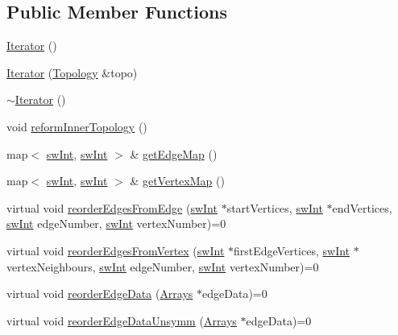 \subsection*{Public Member Functions}
\begin{DoxyCompactItemize}
\item 
\hyperlink{classIterator_a30f4489aebb0ea1a56da6925d03eecfb}{Iterator} ()
\item 
\hyperlink{classIterator_a74d2719764b4adbc85d62efd8b7aefaf}{Iterator} (\hyperlink{classTopology}{Topology} \&topo)
\item 
\hyperlink{classIterator_aab6716f5bdecb49e9cdd754359408ab6}{$\sim$Iterator} ()
\item 
void \hyperlink{classIterator_ad08f622629417fb8913d18d95150d8de}{reformInnerTopology} ()
\item 
map$<$ \hyperlink{swMacro_8h_a113cf5f6b5377cdf3fac6aa4e443e9aa}{swInt}, \hyperlink{swMacro_8h_a113cf5f6b5377cdf3fac6aa4e443e9aa}{swInt} $>$ \& \hyperlink{classIterator_ac3a2a5c322b527888c8689dd688f9aed}{getEdgeMap} ()
\item 
map$<$ \hyperlink{swMacro_8h_a113cf5f6b5377cdf3fac6aa4e443e9aa}{swInt}, \hyperlink{swMacro_8h_a113cf5f6b5377cdf3fac6aa4e443e9aa}{swInt} $>$ \& \hyperlink{classIterator_aa40b90d401685840ead9626e4ce067f0}{getVertexMap} ()
\item 
virtual void \hyperlink{classIterator_ad467453135759642e4e4a9f9e5233771}{reorderEdgesFromEdge} (\hyperlink{swMacro_8h_a113cf5f6b5377cdf3fac6aa4e443e9aa}{swInt} $\ast$startVertices, \hyperlink{swMacro_8h_a113cf5f6b5377cdf3fac6aa4e443e9aa}{swInt} $\ast$endVertices, \hyperlink{swMacro_8h_a113cf5f6b5377cdf3fac6aa4e443e9aa}{swInt} edgeNumber, \hyperlink{swMacro_8h_a113cf5f6b5377cdf3fac6aa4e443e9aa}{swInt} vertexNumber)=0
\item 
virtual void \hyperlink{classIterator_a852bc84ccdfc84a9f0802ee070dd4cac}{reorderEdgesFromVertex} (\hyperlink{swMacro_8h_a113cf5f6b5377cdf3fac6aa4e443e9aa}{swInt} $\ast$firstEdgeVertices, \hyperlink{swMacro_8h_a113cf5f6b5377cdf3fac6aa4e443e9aa}{swInt} $\ast$vertexNeighbours, \hyperlink{swMacro_8h_a113cf5f6b5377cdf3fac6aa4e443e9aa}{swInt} edgeNumber, \hyperlink{swMacro_8h_a113cf5f6b5377cdf3fac6aa4e443e9aa}{swInt} vertexNumber)=0
\item 
virtual void \hyperlink{classIterator_a4a803a634065aba90c6a7572542aa8c3}{reorderEdgeData} (\hyperlink{structArrays}{Arrays} $\ast$edgeData)=0
\item 
virtual void \hyperlink{classIterator_aea73c3b4ba7c3cb6c56df6c5ddbe1f31}{reorderEdgeDataUnsymm} (\hyperlink{structArrays}{Arrays} $\ast$edgeData)=0

\end{DoxyCompactItemize}
